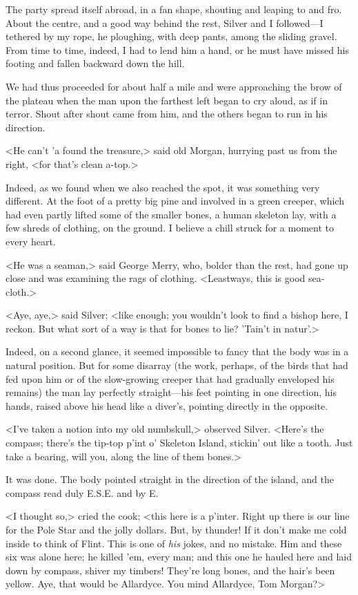 The party spread itself abroad, in a fan shape, shouting and leaping to and fro. About the centre, and a good way behind the rest, Silver and I followed—I tethered by my rope, he ploughing, with deep pants, among the sliding gravel. From time to time, indeed, I had to lend him a hand, or he must have missed his footing and fallen backward down the hill.

We had thus proceeded for about half a mile and were approaching the brow of the plateau when the man upon the farthest left began to cry aloud, as if in terror. Shout after shout came from him, and the others began to run in his direction.

<He can't 'a found the treasure,> said old Morgan, hurrying past us from the right, <for that's clean a-top.>

Indeed, as we found when we also reached the spot, it was something very different. At the foot of a pretty big pine and involved in a green creeper, which had even partly lifted some of the smaller bones, a human skeleton lay, with a few shreds of clothing, on the ground. I believe a chill struck for a moment to every heart.

<He was a seaman,> said George Merry, who, bolder than the rest, had gone up close and was examining the rags of clothing. <Leastways, this is good sea-cloth.>

<Aye, aye,> said Silver; <like enough; you wouldn't look to find a bishop here, I reckon. But what sort of a way is that for bones to lie? 'Tain't in natur'.>

Indeed, on a second glance, it seemed impossible to fancy that the body was in a natural position. But for some disarray (the work, perhaps, of the birds that had fed upon him or of the slow-growing creeper that had gradually enveloped his remains) the man lay perfectly straight—his feet pointing in one direction, his hands, raised above his head like a diver's, pointing directly in the opposite.

<I've taken a notion into my old numbskull,> observed Silver. <Here's the compass; there's the tip-top p'int o' Skeleton Island, stickin' out like a tooth. Just take a bearing, will you, along the line of them bones.>

It was done. The body pointed straight in the direction of the island, and the compass read duly E\@.S\@.E\@. and by E\@.

<I thought so,> cried the cook; <this here is a p'inter. Right up there is our line for the Pole Star and the jolly dollars. But, by thunder! If it don't make me cold inside to think of Flint. This is one of \textit{his} jokes, and no mistake. Him and these six was alone here; he killed 'em, every man; and this one he hauled here and laid down by compass, shiver my timbers! They're long bones, and the hair's been yellow. Aye, that would be Allardyce. You mind Allardyce, Tom Morgan?>

